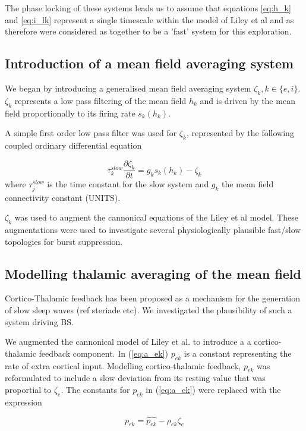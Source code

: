 \documentclass[a4paper,12pt]{article}
\begin{document}
The phase locking of these systems leads us to assume that equations \ref{eq:h_k} and \ref{eq:i_lk} represent a single
timescale within the model of Liley et al and as therefore were considered as together to be a 'fast' system for this
exploration.

\subsection{Introduction of a mean field averaging system}

We began by introducing a generalised mean field averaging system $\zeta_{k}, k \in \{e, i\}$.  $\zeta_{k}$ represents a low pass filtering of the mean field $h_k$ and is driven by the mean field proportionally to its firing rate $s_{k}(h_{k})$.

A simple first order low pass filter was used for $\zeta_k$, represented by the following coupled ordinary differential equation

\begin{equation} \label{eq:zeta_slow} 
\tau_k^{slow} \frac{\partial \zeta_k}{\partial t} = g_k s_k(h_k) - \zeta_k
\end{equation}
where $\tau_j^{slow}$ is the time constant for the slow system and $g_k$ the mean field connectivity
constant (UNITS).

$\zeta_{k}$ was used to augment the cannonical equations of the Liley et al model. These augmentations were used to investigate several physiologically plausible fast/slow topologies for burst suppression.

\subsection{Modelling thalamic averaging of the mean field}
Cortico-Thalamic feedback has been proposed as a mechanism for the generation of slow sleep waves (ref steriade etc). 
We investigated the plausibility of such a system driving BS. 

We augmented the cannonical model of Liley et al. to introduce a a cortico-thalamic feedback component. 
In (\ref{eq:a_ek}) $p_{ek}$ is a constant representing the rate of extra cortical input. Modelling cortico-thalamic feedback, $p_{ek}$ was reformulated to include a slow deviation from its resting value that was proportial to $\zeta_e$. The constants for $p_{ek}$ in (\ref{eq:a_ek}) were replaced with the expression

\begin{equation} \label{eq:p_ek}
p_{ek} = \hat{p_{ek}} - \rho_{ek} \zeta_e
\end{equation}
\end{document}
